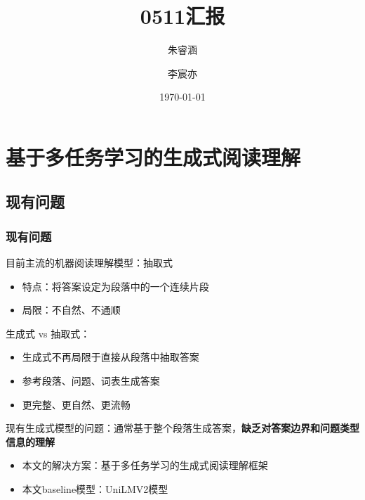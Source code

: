 \documentclass{beamer}
\title{0511汇报}
\institute{项目三}
\author{朱睿涵 \and 李宸亦}
\date{\today}
\begin{document}
\frame{\titlepage} %


\section{基于多任务学习的生成式阅读理解}
\subsection{现有问题}
\begin{frame}
    \frametitle{现有问题}

    目前主流的机器阅读理解模型：抽取式

    \begin{itemize}
        \item 特点：将答案设定为段落中的一个连续片段
        \item 局限：不自然、不通顺
    \end{itemize}

    生成式 vs 抽取式：

    \begin{itemize}
        \item 生成式不再局限于直接从段落中抽取答案
        \item 参考段落、问题、词表生成答案
        \item 更完整、更自然、更流畅
    \end{itemize}

    现有生成式模型的问题：通常基于整个段落生成答案，\textbf{缺乏对答案边界和问题类型信息的理解}

    \begin{itemize}
        \item 本文的解决方案：基于多任务学习的生成式阅读理解框架
        \item 本文baseline模型：UniLMV2模型
    \end{itemize}

\end{frame}
\end{document}
